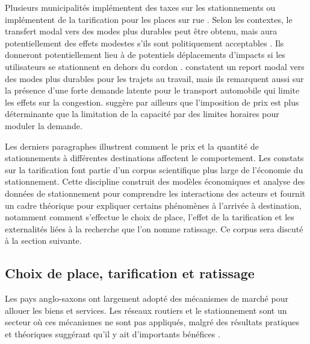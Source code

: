         Plusieurs municipalités implémentent des taxes sur les stationnements \parencite{richardson_extracting_2010,dale_evaluating_2017,dale_impact_2019,hamer_exploring_2009} ou implémentent de la tarification pour les places sur rue \parencite{wei_analysis_2008,hensher_parking_2001}. Selon les contextes, le transfert modal vers des modes plus durables peut être obtenu, mais aura potentiellement des effets modestes s'ils sont politiquement acceptables \parencite{bianco_strategies_1998,hensher_parking_2001}. Ils donneront potentiellement lieu à de potentiels déplacements d'impacts si les utilisateurs se stationnent en dehors du cordon \parencite{wei_analysis_2008}. \textcite{dale_impact_2019} constatent un report modal vers des modes plus durables pour les trajets au travail, mais ils remarquent aussi sur la présence d'une forte demande latente pour le transport automobile qui limite les effets sur la congestion. \textcite{hensher_parking_2001} suggère par ailleurs que l'imposition de prix est plus déterminante que la limitation de la capacité par des limites horaires pour moduler la demande.

        Les derniers paragraphes illustrent comment le prix et la quantité de stationnements à différentes destinations affectent le comportement. Les constats sur la tarification font partie d'un corpus scientifique plus large de l'économie du stationnement. Cette discipline construit des modèles économiques et analyse des données de stationnement pour comprendre les interactions des acteurs et fournit un cadre théorique pour expliquer certains phénomènes à l'arrivée à destination, notamment comment s'effectue le choix de place, l'effet de la tarification et les externalités liées à la recherche que l'on nomme ratissage. Ce corpus sera discuté à la section suivante.
        
    \subsection{Choix de place, tarification et ratissage}
        Les pays anglo-saxons ont largement adopté des mécanismes de marché pour allouer les biens et services. Les réseaux routiers et le stationnement sont un secteur où ces mécanismes ne sont pas appliqués, malgré des résultats pratiques et théoriques suggérant qu'il y ait d'importants bénéfices \parencite{button_political_2006,donald_shoup_introduction_2016,shoup_high_2005,walters_theory_1961,inci_review_2015,vickrey_statement_1994}.\par

